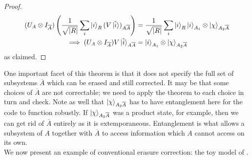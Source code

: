 \documentclass[12pt,a4paper]{report}
\numberwithin{equation}{section}
\newcommand{\ol}[1]{\overline{#1}}
\theoremstyle{definition}
\theoremstyle{theorem}
\theoremstyle{theorem}
\theoremstyle{example}
\theoremstyle{definition}
\begin{document}
\begin{proof}
	\begin{equation}
		\begin{aligned}
			(U_{A}\otimes I_{\ol{A}})\left(\frac{1}{\sqrt{|R|}}\sum_{i}\ket{i}_{R}(V\ket{\tilde{i}})_{A\overline{A}}\right)&=\frac{1}{\sqrt{|R|}}\sum_{i}\ket{i}_{R}\ket{i}_{A_{1}}\otimes\ket{\chi}_{A_{2}\overline{A}}\\
			\implies (U_{A}\otimes I_{\ol{A}})V\ket{\tilde{i}}_{A\overline{A}}&=\ket{i}_{A_{1}}\otimes\ket{\chi}_{A_{2}\overline{A}}
		\end{aligned}
	\end{equation}
	as claimed.
\end{proof}
One important facet of this theorem is that it does not specify the full set of subsystems $\ol{A}$ which can be erased and still corrected. It may be that some choices of $\ol{A}$ are not correctable; we need to apply the theorem to each choice in turn and check. Note as well that $\ket{\chi}_{A_{2}\ol{A}}$ has to have entanglement here for the code to function robustly. If $\ket{\chi}_{A_{2}\ol{A}}$ was a product state, for example, then we can get rid of $\ol{A}$ entirely as it is extemporaneous. Entanglement is what allows a subsystem of $A$ together with $\ol{A}$ to access information which $A$ cannot access on its own.\\
We now present an example of conventional erasure correction: the toy model of \cite{Harlow}.
\end{document}
